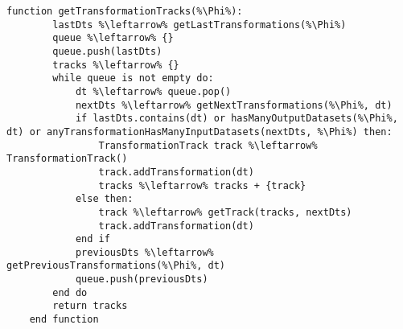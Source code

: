 \begin{lstlisting}[language=pseudocode,label={lst:algorithm-transformation-tracks},caption={[Detecção das trilhas de transformações]Detecção do rastro em nível de fluxo de dados baseado nas trilhas de transformações.}]
    function getTransformationTracks(%\Phi%):
        lastDts %\leftarrow% getLastTransformations(%\Phi%)
        queue %\leftarrow% {}
        queue.push(lastDts)
        tracks %\leftarrow% {}
        while queue is not empty do:
            dt %\leftarrow% queue.pop()
            nextDts %\leftarrow% getNextTransformations(%\Phi%, dt)
            if lastDts.contains(dt) or hasManyOutputDatasets(%\Phi%, dt) or anyTransformationHasManyInputDatasets(nextDts, %\Phi%) then:
                TransformationTrack track %\leftarrow% TransformationTrack()
                track.addTransformation(dt)
                tracks %\leftarrow% tracks + {track}
            else then:
                track %\leftarrow% getTrack(tracks, nextDts)
                track.addTransformation(dt)
            end if
            previousDts %\leftarrow% getPreviousTransformations(%\Phi%, dt)
            queue.push(previousDts)
        end do
        return tracks
    end function
\end{lstlisting}


